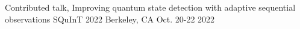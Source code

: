 
\begin{cventries}

  \cventry
    {Contributed talk, Improving quantum state detection with adaptive sequential observations} %
    {SQuInT 2022} %
    {Berkeley, CA} %
    {Oct. 20-22 2022} %
    {}

\end{cventries}

